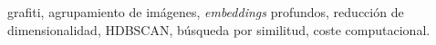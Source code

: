 grafiti, agrupamiento de imágenes, \textit{embeddings}
profundos, reducción de dimensionalidad, HDBSCAN, búsqueda por similitud, coste
computacional.